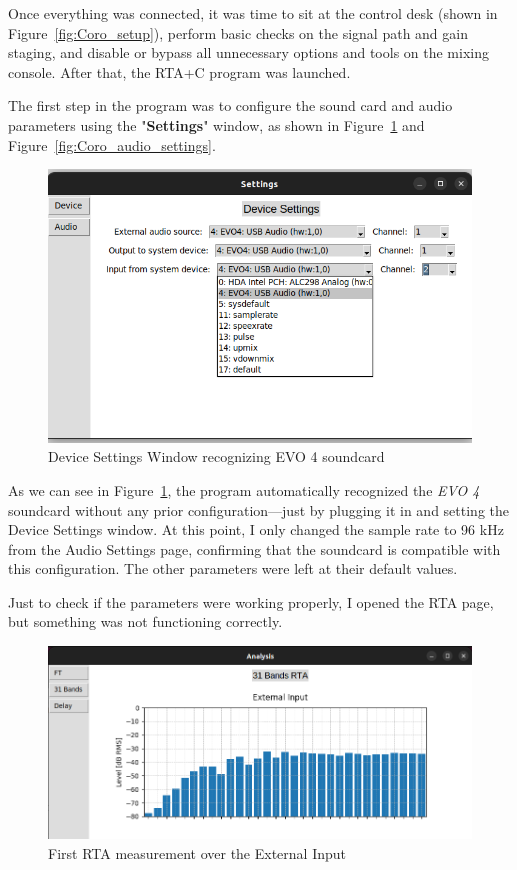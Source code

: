 Once everything was connected, it was time to sit at the control desk (shown in Figure~\ref{fig:Coro_setup}), perform basic checks on the signal path and gain staging, and disable or bypass all unnecessary options and tools on the mixing console. After that, the RTA+C program was launched.

The first step in the program was to configure the sound card and audio parameters using the "\textbf{Settings}" window, as shown in Figure~\ref{fig:Coro_device_settings} and Figure~\ref{fig:Coro_audio_settings}.


\begin{figure}[H]
	\centering
	\includegraphics[width=0.8
	\linewidth]{Figures/Coro_Device_settings.png}
	\caption{Device Settings Window recognizing EVO 4 soundcard}
	\label{fig:Coro_device_settings}
\end{figure}

As we can see in Figure~\ref{fig:Coro_device_settings}, the program automatically recognized the \textit{EVO 4} soundcard without any prior configuration—just by plugging it in and setting the Device Settings window. At this point, I only changed the sample rate to 96 kHz from the Audio Settings page, confirming that the soundcard is compatible with this configuration. The other parameters were left at their default values.

Just to check if the parameters were working properly, I opened the RTA page, but something was not functioning correctly.

\begin{figure}[H]
	\centering
	\includegraphics[width=0.8
	\linewidth]{Figures/Coro_Pink_Bad.png}
	\caption{First RTA measurement over the External Input}
	\label{fig:Coro_Bad_Pink}
\end{figure}

